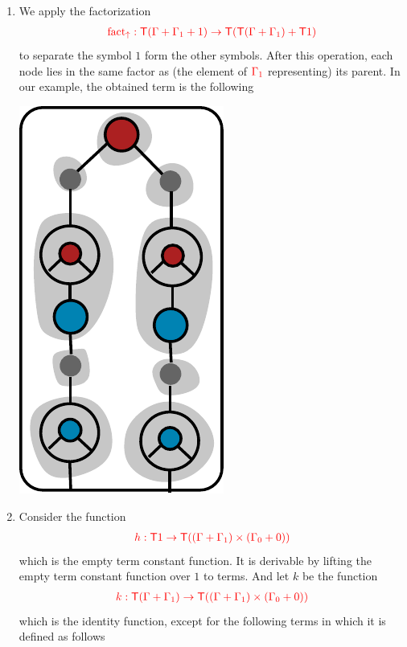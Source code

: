 \begin{example}
\begin{enumerate}
\begin{center}
		\end{center}
\item We apply the factorization 
\begin{align*}
{\color{red}{{\color{red}{\mathrm{fact_{\uparrow}}}}: {\color{red}{\mathsf T}}(\Gamma+\Gamma_1+1) \to {\color{red}{\mathsf T}}({\color{red}{\mathsf T}}(\Gamma+\Gamma_1)+{\color{red}{\mathsf T}}1)}}
\end{align*}
 to separate the symbol $1$ form the other symbols. After this operation, each node lies in the same factor as (the element of $\ranked{\Gamma_1}$ representing) its parent. In our example, the obtained term is the following
\begin{center}
		\includegraphics[scale=.4]{pictures/parent-block.pdf}
		\end{center}
\item Consider the function 
\begin{align*}
{\color{red}{h: {\color{red}{\mathsf T}}1 \to {\color{red}{\mathsf T}}((\Gamma+\Gamma_1)\times(\Gamma_0+0))}}
\end{align*}
which is the empty term constant function. It is derivable by lifting the empty term constant function over $1$ to terms.
And let $k$ be the function
\begin{align*}
{\color{red}{k: {\color{red}{\mathsf T}}(\Gamma+\Gamma_1) \to {\color{red}{\mathsf T}}((\Gamma+\Gamma_1)\times(\Gamma_0+0))}}
\end{align*}
which is the identity function, except for the following terms in which it is defined as follows
$$\begin{array}{rll}

\end{array}$$
\end{enumerate}
\end{example}
